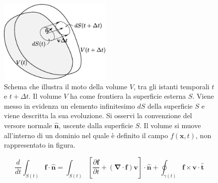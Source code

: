 \begin{figure}[h]%
 \centering
 \includegraphics[width=0.48\textwidth]{./fig/vol.eps}
 \caption{Schema che illustra il moto della volume $V$, tra gli istanti temporali $t$ e 
          $t+\Delta t$. Il volume $V$ ha come frontiera la superficie esterna $S$. Viene
          messo in evidenza un elemento infinitesimo $dS$ della superficie $S$ e viene
          descritta la sua evoluzione. Si osservi la convenzione del versore normale $\bm{\hat{n}}$,
          uscente dalla superficie $S$. Il volume si muove all'interno di un dominio nel quale è
          definito il campo $f(\bm{x},t)$, non rappresentato in figura.}
\label{fig:vol}
\end{figure} 

\newpage
\begin{theorem}
\begin{equation}
  \frac{d}{dt}\int_{S(t)} \bm{f}\cdot{\bm{\hat{n}}} = 
  \int_{S(t)} \left[\frac{\partial \bm{f}}{\partial t} +
  (\bm{\nabla}\cdot\bm{f}) \bm{v} \right] \cdot{\bm{\hat{n}}}  + 
  \oint_{\gamma(t)} \bm{f} \times \bm{v} \cdot \bm{\hat{t}}
\end{equation}
\end{theorem}

